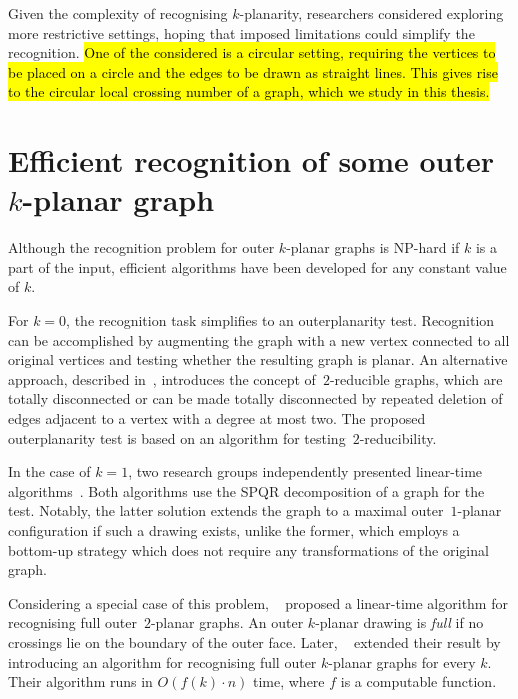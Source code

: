 Given the complexity of recognising \(k\)-planarity, researchers considered exploring more restrictive settings, hoping that imposed limitations could simplify the recognition. \hl{One of the considered is a circular setting, requiring the vertices to be placed on a circle and the edges to be drawn as straight lines. This gives rise to the circular local crossing number of a graph, which we study in this thesis.}


\section{Efficient recognition of some outer \texorpdfstring{\(k\)}{k}-planar graph}

Although the recognition problem for outer \(k\)-planar graphs is NP-hard if \(k\) is a part of the input, efficient algorithms have been developed for any constant value of \(k\).

For \(k = 0\), the recognition task simplifies to an outerplanarity test. Recognition can be accomplished by augmenting the graph with a new vertex connected to all original vertices and testing whether the resulting graph is planar. An alternative approach, described in~\cite{linear-op}, introduces the concept of~\(2\)-reducible graphs, which are totally disconnected or can be made totally disconnected by repeated deletion of edges adjacent to a vertex with a degree at most two. The proposed outerplanarity test is based on an algorithm for testing~\(2\)-reducibility.

In the case of \(k = 1\), two research groups independently presented linear-time algorithms~\cite{linear-o1p_, linear-o1p}. Both algorithms use the SPQR decomposition of a graph for the test. Notably, the latter solution extends the graph to a maximal outer~\(1\)-planar configuration if such a drawing exists, unlike the former, which employs a bottom-up strategy which does not require any transformations of the original graph.

Considering a special case of this problem, \citeauthor{linear-full-o2p}~\cite{linear-full-o2p} proposed a linear-time algorithm for recognising full outer~\(2\)-planar graphs. An outer \(k\)-planar drawing is \emph{full} if no crossings lie on the boundary of the outer face. Later, \citeauthor{linear-full-okp}~\cite{linear-full-okp} extended their result by introducing an algorithm for recognising full outer \(k\)-planar graphs for every \(k\). Their algorithm runs in \(O(f(k) \cdot n)\) time, where \(f\) is a computable function.


